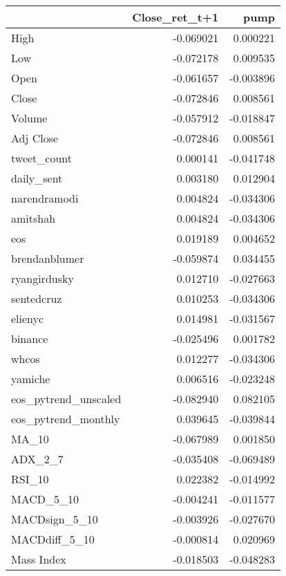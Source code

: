 \begin{tabular}{lrr}
\toprule
{} &  Close\_ret\_t+1 &      pump \\
\midrule
High                 &      -0.069021 &  0.000221 \\
Low                  &      -0.072178 &  0.009535 \\
Open                 &      -0.061657 & -0.003896 \\
Close                &      -0.072846 &  0.008561 \\
Volume               &      -0.057912 & -0.018847 \\
Adj Close            &      -0.072846 &  0.008561 \\
tweet\_count          &       0.000141 & -0.041748 \\
daily\_sent           &       0.003180 &  0.012904 \\
narendramodi         &       0.004824 & -0.034306 \\
amitshah             &       0.004824 & -0.034306 \\
eos                  &       0.019189 &  0.004652 \\
brendanblumer        &      -0.059874 &  0.034455 \\
ryangirdusky         &       0.012710 & -0.027663 \\
sentedcruz           &       0.010253 & -0.034306 \\
elienyc              &       0.014981 & -0.031567 \\
binance              &      -0.025496 &  0.001782 \\
whcos                &       0.012277 & -0.034306 \\
yamiche              &       0.006516 & -0.023248 \\
eos\_pytrend\_unscaled &      -0.082940 &  0.082105 \\
eos\_pytrend\_monthly  &       0.039645 & -0.039844 \\
MA\_10                &      -0.067989 &  0.001850 \\
ADX\_2\_7              &      -0.035408 & -0.069489 \\
RSI\_10               &       0.022382 & -0.014992 \\
MACD\_5\_10            &      -0.004241 & -0.011577 \\
MACDsign\_5\_10        &      -0.003926 & -0.027670 \\
MACDdiff\_5\_10        &      -0.000814 &  0.020969 \\
Mass Index           &      -0.018503 & -0.048283 \\

\end{tabular}
